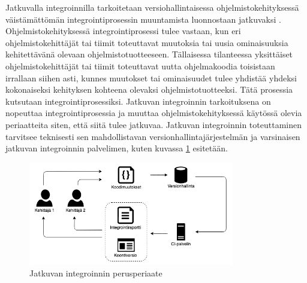   Jatkuvalla integroinnilla tarkoitetaan versiohallintaisessa ohjelmistokehityksessä väistämättömän integrointiprosessin muuntamista luonnostaan jatkuvaksi \parencite{continuous_integration_integration_process}.
  Ohjelmistokehityksessä integrointiprosessi tulee vastaan, kun eri ohjelmistokehittäjät tai tiimit toteuttavat muutoksia tai uusia ominaisuuksia kehitettävänä olevaan ohjelmistotuotteeseen.
  Tällaisessa tilanteessa yksittäiset ohjelmistokehittäjät tai tiimit toteuttavat uutta ohjelmakoodia toisistaan irrallaan siihen asti, kunnes muutokset tai ominaisuudet tulee yhdistää yhdeksi kokonaiseksi kehityksen kohteena olevaksi ohjelmistotuotteeksi.
  Tätä prosessia kutsutaan integrointiprosessiksi.
  Jatkuvan integroinnin tarkoituksena on nopeuttaa integrointiprosessia ja muuttaa ohjelmistokehityksessä käytössä olevia periaatteita siten, että siitä tulee jatkuvaa.
  Jatkuvan integroinnin toteuttaminen tarvitsee teknisesti sen mahdollistavan versionhallintajärjestelmän ja varsinaisen jatkuvan integroinnin palvelimen, kuten kuvassa \ref{fig:jatkuva-integrointi} esitetään.

  \begin{figure}[H]
    \centering
    \includegraphics[width=0.8\textwidth]{assets/jatkuva-integrointi.png}
    \caption{Jatkuvan integroinnin perusperiaate}
    \label{fig:jatkuva-integrointi}
  \end{figure}

